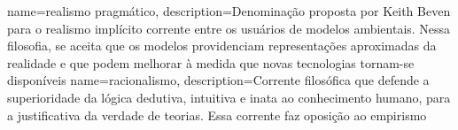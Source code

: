 {
    name=realismo pragmático,
    description={Denominação proposta por Keith Beven para o realismo implícito corrente entre os usuários de modelos ambientais. Nessa filosofia, se aceita que os modelos providenciam representações aproximadas da realidade e que podem melhorar à medida que novas tecnologias tornam-se disponíveis}
}
{
    name=racionalismo,
    description={Corrente filosófica que defende a superioridade da lógica dedutiva, intuitiva e inata ao conhecimento humano, para a justificativa da verdade de teorias. Essa corrente faz oposição ao empirismo}
}
